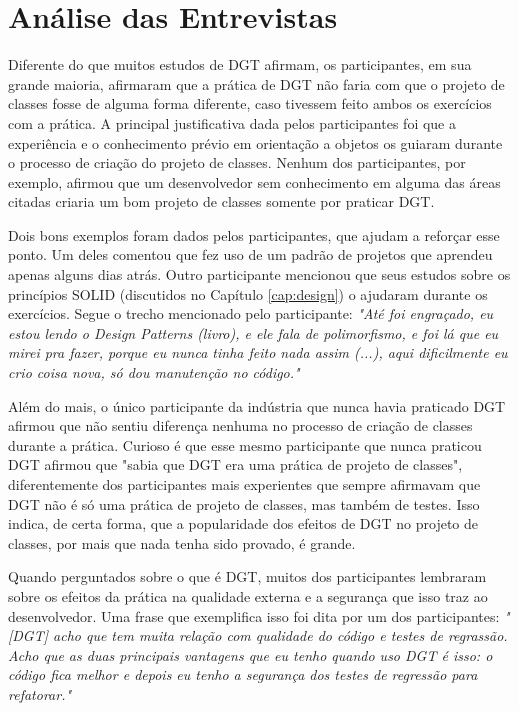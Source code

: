 \section{Análise das Entrevistas}

Diferente do que muitos estudos de DGT afirmam, os participantes, em sua grande maioria, afirmaram que 
a prática de DGT não faria com que o projeto de classes fosse de alguma forma diferente, caso tivessem
feito ambos os exercícios com a prática.
A principal justificativa dada pelos participantes foi que a experiência e o conhecimento prévio
em orientação a objetos os guiaram durante o processo de criação do projeto de classes. Nenhum dos
participantes, por exemplo, afirmou que um desenvolvedor sem conhecimento em alguma das áreas
citadas criaria um bom projeto de classes somente por praticar DGT.

Dois bons exemplos foram dados pelos participantes, que ajudam a reforçar esse ponto. Um deles
comentou que fez uso de um padrão de projetos \cite{gof} que aprendeu apenas alguns dias atrás.
Outro participante mencionou que seus estudos sobre os princípios SOLID (discutidos no Capítulo \ref{cap:design})
o ajudaram durante os exercícios. Segue o trecho mencionado pelo participante:
\textit{"Até foi engraçado, eu estou lendo o Design Patterns (livro), e ele fala de polimorfismo, e foi
lá que eu mirei pra fazer, porque eu nunca tinha feito nada assim (...), aqui dificilmente eu crio
coisa nova, só dou manutenção no código."}

Além do mais, o único participante da indústria que nunca havia
praticado DGT afirmou que não sentiu diferença nenhuma no processo de criação de classes durante
a prática.
Curioso é que esse mesmo participante que nunca praticou DGT afirmou que "sabia que DGT era uma prática de projeto de classes",
diferentemente dos participantes mais experientes que sempre afirmavam que DGT não é só uma prática de projeto de classes,
mas também de testes. Isso indica, de certa forma, que a popularidade dos efeitos de DGT no projeto de classes, por mais
que nada tenha sido provado, é grande.

Quando perguntados sobre o que é DGT, muitos dos participantes lembraram sobre
os efeitos da prática na qualidade externa e a segurança que isso traz
ao desenvolvedor.
Uma frase que exemplifica isso foi dita por um dos participantes:
\textit{"[DGT] acho que tem muita relação com qualidade do código e testes 
de regrassão. Acho que as duas principais vantagens que eu tenho quando uso DGT é isso: o código
fica melhor e depois eu tenho a segurança dos testes de regressão para refatorar."}

